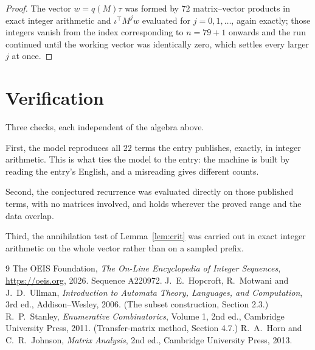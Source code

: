 \documentclass[11pt,a4paper]{article}
\theoremstyle{plain}
\theoremstyle{definition}
\begin{document}
\begin{proof}
The vector $w=q(M)\tau$ was formed by $72$ matrix--vector products in exact integer
arithmetic and $\iota^{\!\top}M^{j}w$ evaluated for $j=0,1,\dots$, again exactly; those
integers vanish from the index corresponding to $n=79+1$ onwards and the run continued
until the working vector was identically zero, which settles every larger $j$ at once.
\end{proof}

\section{Verification}

Three checks, each independent of the algebra above.

First, the model reproduces all $22$ terms the entry publishes, exactly, in integer
arithmetic. This is what ties the model to the entry: the machine is built by reading the
entry's English, and a misreading gives different counts.

Second, the conjectured recurrence was evaluated directly on those published terms, with no
matrices involved, and holds wherever the proved range and the data overlap.

Third, the annihilation test of Lemma~\ref{lem:crit} was carried out in exact integer
arithmetic on the whole vector rather than on a sampled prefix.

\begin{thebibliography}{9}
 The OEIS Foundation, \emph{The On-Line Encyclopedia of Integer
Sequences}, \url{https://oeis.org}, 2026. Sequence A220972.
 J.~E.~Hopcroft, R.~Motwani and J.~D.~Ullman, \emph{Introduction to Automata
Theory, Languages, and Computation}, 3rd ed., Addison--Wesley, 2006. (The subset
construction, Section 2.3.)
 R.~P.~Stanley, \emph{Enumerative Combinatorics}, Volume 1, 2nd ed.,
Cambridge University Press, 2011. (Transfer-matrix method, Section 4.7.)
 R.~A.~Horn and C.~R.~Johnson, \emph{Matrix Analysis}, 2nd ed., Cambridge
University Press, 2013.
\end{thebibliography}
\end{document}
